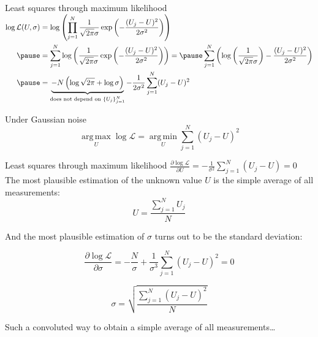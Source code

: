 \documentclass[UKenglish,aspectratio=169]{beamer}
\DeclareMathOperator*{\argmin}{arg\,min}
\DeclareMathOperator*{\argmax}{arg\,max}
\begin{document}
\begin{frame}{Least squares through maximum likelihood}
$
\begin{aligned}
\log \mathcal{L}(U,\sigma) & = \log \left(\prod\limits_{j=1}^N  \frac{1}{\sqrt{2\pi}\sigma} \exp\left(-\frac{(U_j-U)^2}{2\sigma^2}\right)\right) \\ \pause
& = \sum\limits_{j=1}^N \log \left(\frac{1}{\sqrt{2\pi}\sigma} \exp\left(-\frac{(U_j-U)^2}{2\sigma^2}\right)\right) =  \pause
  \sum\limits_{j=1}^N \left(\log \left(\frac{1}{\sqrt{2\pi}\sigma}\right) -\frac{(U_j-U)^2}{2\sigma^2}\right)  \\ \pause
& = \underbrace{-N \left(\log\sqrt{2\pi} + \log\sigma\right)}_{\text{does not depend on } \{U_j\}_{j=1}^{N}} - \frac{1}{2\sigma^2} \sum\limits_{j=1}^N (U_j-U)^2
\end{aligned}
$

\begin{block}{Under Gaussian noise}
$$
\argmax\limits_{U} \log \mathcal{L} = \argmin\limits_U \sum\limits_{j=1}^N (U_j-U)^2
$$
\end{block}
\end{frame}

\begin{frame}{Least squares through maximum likelihood}
$
\frac{\partial\log\mathcal{L}}{\partial U}    = - \frac{1}{\sigma^2}\sum\limits_{j=1}^N (U_j-U) = 0 
$\\ \pause
The most plausible estimation of the unknown value $U$ is the simple average of all measurements:
$$
U = \frac{\sum\limits_{j=1}^N U_j}{N}
$$

\pause And the most plausible estimation of $\sigma$ turns out to be the standard deviation:
\begin{minipage}{.45\linewidth}
$$
\frac{\partial\log\mathcal{L}}{\partial\sigma} =  -\frac{N}{\sigma} + \frac{1}{\sigma^3}\sum\limits_{j=1}^N (U_j-U)^2 = 0
$$
\end{minipage} \pause
\begin{minipage}{.45\linewidth}
$$
\sigma = \sqrt{\frac{\sum\limits_{j=1}^N (U_j-U)^2}{N}}
$$
\end{minipage}

\vspace{15pt}
Such a convoluted way to obtain a simple average of all measurements\dots
\end{frame}
\end{document}
